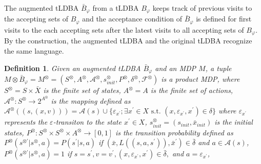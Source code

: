\documentclass[letterpaper, 10 pt, conference]{ieeeconf}  %
\newtheorem{definition}{Definition}
\begin{document}
The augmented tLDBA $\bar{B}_{\varphi}$ from a tLDBA $B_{\varphi}$ keeps track of previous visits to the accepting sets of $B_{\varphi}$ and the acceptance condition of $\bar{B}_{\varphi}$ is defined for first visits to the each accepting sets after the latest visits to all accepting sets of $B_{\varphi}$. By the construction, the augmented tLDBA and the original tLDBA recognize the same language.

\begin{definition}
  Given an augmented tLDBA $\bar{B}_{\varphi}$ and an MDP $M$, a tuple $M \otimes \bar{B}_{\varphi} = M^{\otimes} = (S^{\otimes}, A^{\otimes}, {\mathcal A}^{\otimes}, s_{init}^{\otimes}, P^{\otimes}, \delta^{\otimes}, {\mathcal F}^{\otimes})$ is a product MDP, where
  $S^{\otimes} = S \times \bar{X}$ is the finite set of states, $A^{\otimes}=A$ is the finite set of actions, ${\mathcal A}^{\otimes} : S^{\otimes} \rightarrow 2^{A^{\otimes}}$ is the mapping defined as ${\mathcal A}^{\otimes}((s,(x,v))) = {\mathcal A}(s) \cup \{ \varepsilon_{x^{\prime}} ; \exists x^{\prime}\! \in \! X \text{ s.t. } (x,\varepsilon_{x^{\prime}}, x^{\prime}) \in \delta \}$ where $\varepsilon_{x^{\prime}}$ represents the $\varepsilon$-transiton to the state $x^{\prime}\! \in\! X$, $s_{init}^{\otimes} = (s_{init},\bar{x}_{init})$ is the initial states, $P^{\otimes} : S^{\otimes} \times S^{\otimes} \times A^{\otimes} \rightarrow [0,1]$ is the transition probability defined as $P^{\otimes}(s^{\otimes \prime} | s^{\otimes}, a) = P(s^{\prime} | s, a)$ if $ (\bar{x}, L((s,a,s^{\prime})), \bar{x}^{\prime}) \in \bar{\delta}$ and $ a \in \mathcal{A}(s)$, $P^{\otimes}(s^{\otimes \prime} | s^{\otimes}, a) = 1$ if $s\!=\!s^{\prime},v\!=\!v^{\prime},(x, \varepsilon_{x^{\prime}}, x^{\prime})\! \in \! \bar{\delta},$ and $ a=\varepsilon_{x^{\prime}}$,

\end{definition}
\end{document}
